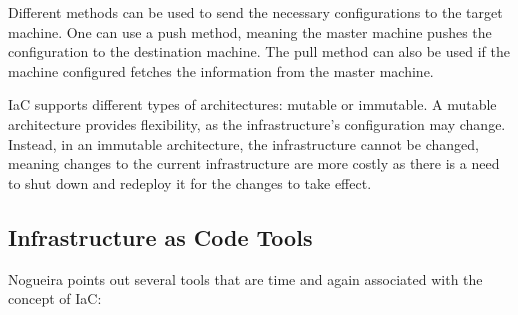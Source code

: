 Different methods can be used to send the necessary configurations to the target machine. One can use a push method, meaning the master machine pushes the configuration to the destination machine. The pull method can also be used if the machine configured fetches the information from the master machine.

IaC supports different types of architectures: mutable or immutable. A mutable architecture provides flexibility, as the infrastructure's configuration may change. Instead, in an immutable architecture, the infrastructure cannot be changed, meaning changes to the current infrastructure are more costly as there is a need to shut down and redeploy it for the changes to take effect.

\subsection{Infrastructure as Code Tools} \label{sec:iac_tools}

Nogueira \cite{automating_open_source_up_ref} points out several tools that are time and again associated with the concept of IaC:

